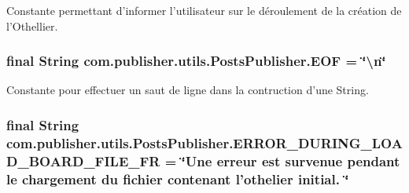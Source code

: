 Constante permettant d'informer l'utilisateur sur le déroulement de la création de l'Othellier. \hypertarget{interfacecom_1_1publisher_1_1utils_1_1PostsPublisher_a80980d1b6eff8ea4d04fe4b277998b38}{
\subsubsection[{E\-O\-F}]{\setlength{\rightskip}{0pt plus 5cm}final String com.\-publisher.\-utils.\-Posts\-Publisher.\-E\-O\-F = \char`\"{}\textbackslash{}n\char`\"{}\hspace{0.3cm}{\ttfamily [static]}}}\label{interfacecom_1_1publisher_1_1utils_1_1PostsPublisher_a80980d1b6eff8ea4d04fe4b277998b38}
Constante pour effectuer un saut de ligne dans la contruction d'une String. \hypertarget{interfacecom_1_1publisher_1_1utils_1_1PostsPublisher_ae9725f99ac0440b88e747722dc3e6e61}{
\subsubsection[{E\-R\-R\-O\-R\-\_\-\-D\-U\-R\-I\-N\-G\-\_\-\-L\-O\-A\-D\-\_\-\-B\-O\-A\-R\-D\-\_\-\-F\-I\-L\-E\-\_\-\-F\-R}]{\setlength{\rightskip}{0pt plus 5cm}final String com.\-publisher.\-utils.\-Posts\-Publisher.\-E\-R\-R\-O\-R\-\_\-\-D\-U\-R\-I\-N\-G\-\_\-\-L\-O\-A\-D\-\_\-\-B\-O\-A\-R\-D\-\_\-\-F\-I\-L\-E\-\_\-\-F\-R = \char`\"{}Une erreur est survenue pendant le chargement du fichier contenant l'othelier initial. \char`\"{}\hspace{0.3cm}{\ttfamily [static]}}}\label{interfacecom_1_1publisher_1_1utils_1_1PostsPublisher_ae9725f99ac0440b88e747722dc3e6e61}
